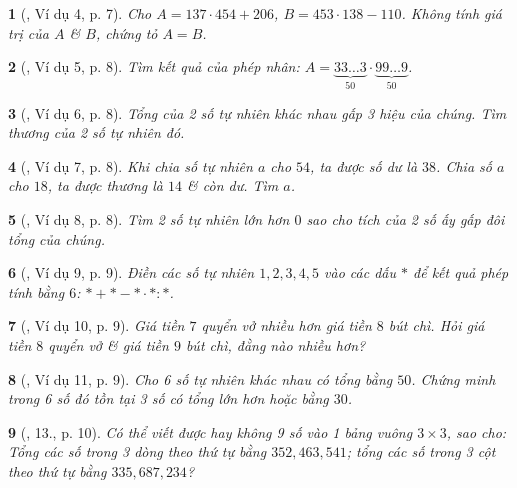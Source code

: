 \documentclass{article}
\newtheorem{baitoan}{}
\begin{document}
\begin{baitoan}[\cite{Binh_Toan_6_tap_1}, Ví dụ 4, p. 7]
	Cho $A = 137\cdot454 + 206$, $B = 453\cdot138 - 110$. Không tính giá trị của $A$ \& $B$, chứng tỏ $A = B$.
\end{baitoan}

\begin{baitoan}[\cite{Binh_Toan_6_tap_1}, Ví dụ 5, p. 8]
	Tìm kết quả của phép nhân: $A = \underbrace{33\ldots3}_{50}\cdot\underbrace{99\ldots9}_{50}$.
\end{baitoan}

\begin{baitoan}[\cite{Binh_Toan_6_tap_1}, Ví dụ 6, p. 8]
	Tổng của 2 số tự nhiên khác nhau gấp 3 hiệu của chúng. Tìm thương của 2 số tự nhiên đó.
\end{baitoan}

\begin{baitoan}[\cite{Binh_Toan_6_tap_1}, Ví dụ 7, p. 8]
	Khi chia số tự nhiên $a$ cho $54$, ta được số dư là $38$. Chia số $a$ cho $18$, ta được thương là $14$ \& còn dư. Tìm $a$.
\end{baitoan}

\begin{baitoan}[\cite{Binh_Toan_6_tap_1}, Ví dụ 8, p. 8]
	Tìm 2 số tự nhiên lớn hơn $0$ sao cho tích của 2 số ấy gấp đôi tổng của chúng.
\end{baitoan}

\begin{baitoan}[\cite{Binh_Toan_6_tap_1}, Ví dụ 9, p. 9]
	Điền các số tự nhiên $1,2,3,4,5$ vào các dấu $*$ để kết quả phép tính bằng $6$:  $*+*-*\cdot*:*$.
\end{baitoan}

\begin{baitoan}[\cite{Binh_Toan_6_tap_1}, Ví dụ 10, p. 9]
	Giá tiền $7$ quyển vở nhiều hơn giá tiền $8$ bút chì. Hỏi giá tiền $8$ quyển vở \& giá tiền $9$ bút chì, đằng nào nhiều hơn?
\end{baitoan}

\begin{baitoan}[\cite{Binh_Toan_6_tap_1}, Ví dụ 11, p. 9]
	Cho 6 số tự nhiên khác nhau có tổng bằng $50$. Chứng minh trong 6 số đó tồn tại 3 số có tổng lớn hơn hoặc bằng $30$.	
\end{baitoan}

\begin{baitoan}[\cite{Binh_Toan_6_tap_1}, 13., p. 10]
	Có thể viết được hay không 9 số vào 1 bảng vuông $3\times 3$, sao cho: Tổng các số trong 3 dòng theo thứ tự bằng $352, 463, 541$; tổng các số trong 3 cột theo thứ tự bằng $335, 687, 234$?
\end{baitoan}
\end{document}
